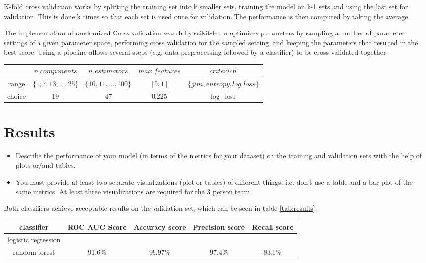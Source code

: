 \documentclass[a4, 10 pt, conference]{ieeeconf}  %
\begin{document}
K-fold cross validation works by splitting the training set into k smaller sets, training the model on k-1 sets and using the last set for validation. This is done k times so that each set is used once for validation. The performance is then computed by taking the average. \cite{sl.cv}

The implementation of randomized Cross validation search by scikit-learn optimizes parameters by sampling a number of parameter settings of a given parameter space, performing cross validation for the sampled setting, and keeping the parameters that resulted in the best score. Using a pipeline allows several steps (e.g. data-preprocessing followed by a classifier) to be cross-validated together. \cite{sl.rcv}

\begin{table*}[hbt]
	\begin{tabular}{c|c|c|c|c}
		& $n\_components$ & $n\_estimators$ & $max\_features$ & $criterion$\\
		\hline range & $\{1, 7, 13,\dots , 25\}$ & $\{10, 11,\dots, 100\}$ & $[0,1]$ & $\{gini, entropy, log\_loss\}$\\
		\hline choice & 19 & 47 & 0.225 & log\_loss
	\end{tabular}
	\caption{Hyperparameter selection random forest}
	\label{tab:param.rf}
\end{table*}

\section{Results}
\label{sec:results}

{\color{blue}

\begin{itemize}
	\item Describe the performance of your model (in terms of the metrics for your dataset) on the training and validation sets with the help of plots or/and tables.
	\item You must provide at least two separate visualizations
          (plot or tables) of different things, i.e. don’t use a table
          and a bar plot of the same metrics. At least three
           visualizations are required for the 3 person team.
\end{itemize}
}

Both classifiers achieve acceptable results on the validation set, which can be seen in table \ref{tab:results}.

\begin{table*}[hbt]
	\begin{tabular}{c|c|c|c|c}
		classifier & ROC AUC Score & Accuracy score & Precision score & Recall score\\
		\hline logistic regression & & & &\\
		\hline random forest & 91.6\% & 99.97\% & 97.4\% & 83.1\%
	\end{tabular}
	\caption{Validation scores random forest}
	\label{tab:results}
\end{table*}
\end{document}

